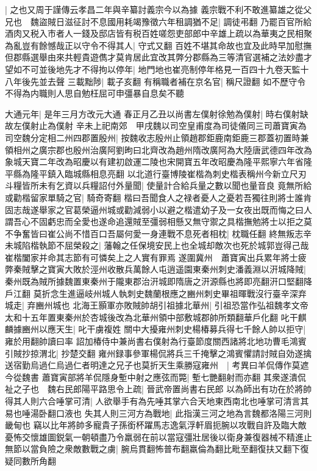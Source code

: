 |{
	之也又周于謹傳云孝昌二年與辛纂討義宗今以為據}
義宗戰不利不敢進纂雄之從父兄也　魏盜賊日滋征討不息國用耗竭豫徵六年租調猶不足|{
	調徒弔翻}
乃罷百官所給酒肉又税入市者人一錢及邸店皆有税百姓嗟怨吏部郎中辛雄上疏以為華夷之民相聚為亂豈有餘憾哉正以守令不得其人|{
	守式又翻}
百姓不堪其命故也宜及此時早加慰撫但郡縣選舉由來共輕貴遊儁才莫肯居此宜改其弊分郡縣為三等清官選補之法妙盡才望如不可並後地先才不得拘以停年|{
	地門地也崔亮制停年格見一百四十九卷天監十八年後先並去聲}
三載黜陟|{
	載子亥翻}
有稱職者補在京名官|{
	稱尺證翻}
如不歷守令不得為内職則人思自勉枉屈可申彊暴自息矣不聽

大通元年|{
	是年三月方改元大通}
春正月乙丑以尚書左僕射徐勉為僕射|{
	時右僕射缺故左僕射止為僕射}
辛未上祀南郊　甲戌魏以司空皇甫度為司徒儀同三司蕭寶寅為司空魏分定相二州四郡置殷州|{
	按魏收志殷州止領趙郡鉅鹿南鉅鹿三郡蓋初置時兼領相州之廣宗郡也殷州治廣阿劉昫曰北齊改為趙州隋改廣阿為大陸唐武德四年改為象城天寶二年改為昭慶以有建初啟運二陵也宋開寶五年改昭慶為隆平熙寧六年省隆平縣為隆平鎮入臨城縣相息亮翻}
以北道行臺博陵崔楷為刺史楷表稱州今新立尺刃斗糧皆所未有乞資以兵糧詔付外量聞|{
	使量計合給兵量之數以聞也量音良}
竟無所給或勸楷留家單騎之官|{
	騎奇寄翻}
楷曰吾聞食人之禄者憂人之憂若吾獨往則將士誰肯固志哉遂舉家之官葛榮逼州城或勸減弱小以避之楷遣幼子及一女夜出既而悔之曰人謂吾心不固虧忠而全愛也遂命追還賊至彊弱相懸又無守禦之具楷撫勉將士以拒之莫不争奮皆曰崔公尚不惜百口吾屬何愛一身連戰不息死者相枕|{
	枕職任翻}
終無叛志辛未城陷楷執節不屈榮殺之|{
	藩翰之任保境安民上也全城却敵次也死於城郭豈得己哉崔楷闔家并命其志節有可憐矣上之人實有罪焉}
遂圍冀州　蕭寶寅出兵累年將士疲弊秦賊擊之寶寅大敗於涇州收散兵萬餘人屯逍遥園東秦州刺史潘義淵以汧城降賊|{
	秦州既為賊所據魏置東秦州于隴東郡治汧城即隋唐之汧源縣也將即亮翻汧口堅翻降戶江翻}
莫折念生進逼岐州城人執刺史魏蘭根應之豳州刺史畢祖暉戰沒行臺辛深弃城走|{
	弃豳州城也}
北海王顥軍亦敗賊帥胡引祖據北華州|{
	引祖恐當作弘祖魏孝文帝太和十五年置東秦州於杏城後改為北華州領中部敷城郡帥所類翻華戶化翻}
叱干麒麟據豳州以應天生|{
	叱干虜複姓}
關中大擾雍州刺史楊椿募兵得七千餘人帥以拒守|{
	雍於用翻帥讀曰率}
詔加椿侍中兼尚書右僕射為行臺節度關西諸將北地功曹毛鴻賓引賊抄掠渭北|{
	抄楚交翻}
雍州録事參軍楊侃將兵三千掩擊之鴻賓懼請討賊自効遂擒送宿勤烏過仁烏過仁者明達之兄子也莫折天生乘勝寇雍州　|{
	考異曰羊侃傳作莫遮今從魏書}
蕭寶寅部將羊侃隱身塹中射之應弦而斃|{
	塹七艷翻射而亦翻}
其衆遂潰侃祉之子也　魏右民郎陽平路思令上疏|{
	晉武帝置尚書右民郎}
以為師出有功在於將帥得其人則六合唾掌可清|{
	人欲舉手有為先唾其掌六合天地東西南北也唾掌可清言其易也唾湯卧翻口液也}
失其人則三河方為戰地|{
	此指漢三河之地為言魏都洛陽三河則畿甸也}
竊以比年將帥多寵貴子孫銜杯躍馬志逸氣浮軒眉扼腕以攻戰自許及臨大敵憂怖交懷雄圖鋭氣一朝頓盡乃令羸弱在前以當寇彊壯居後以衛身兼復器械不精進止無節以當負險之衆敵數戰之虜|{
	腕烏貫翻怖普布翻羸倫為翻比毗至翻復扶又翻下復疑同數所角翻}
